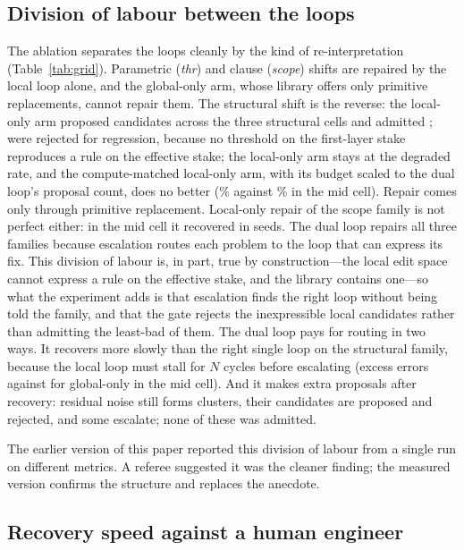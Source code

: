 \documentclass[11pt]{article}
\begin{document}
\subsection{Division of labour between the loops}

The ablation separates the loops cleanly by the kind of re-interpretation (Table~\ref{tab:grid}). Parametric (\emph{thr}) and clause (\emph{scope}) shifts are repaired by the local loop alone, and the global-only arm, whose library offers only primitive replacements, cannot repair them. The structural shift is the reverse: the local-only arm proposed \famstructlocalonlyprop{} candidates across the three structural cells and admitted \famstructlocalonlyadm{}; \famstructlocalonlyreg{} were rejected for regression, because no threshold on the first-layer stake reproduces a rule on the effective stake; the local-only arm stays at the degraded rate, and the compute-matched local-only arm, with its budget scaled to the dual loop's proposal count, does no better (\fpstructlocalonlycm\% against \fpstructdegraded\% in the mid cell). Repair comes only through primitive replacement. Local-only repair of the scope family is not perfect either: in the mid cell it recovered in \loScopeMidRecovered{} seeds. The dual loop repairs all three families because escalation routes each problem to the loop that can express its fix. This division of labour is, in part, true by construction---the local edit space cannot express a rule on the effective stake, and the library contains one---so what the experiment adds is that escalation finds the right loop without being told the family, and that the gate rejects the inexpressible local candidates rather than admitting the least-bad of them. The dual loop pays for routing in two ways. It recovers more slowly than the right single loop on the structural family, because the local loop must stall for $N$ cycles before escalating (excess errors \excstructmiddual{} against \excstructmidglobalonly{} for global-only in the mid cell). And it makes extra proposals after recovery: residual noise still forms clusters, their candidates are proposed and rejected, and some escalate; none of these was admitted.

The earlier version of this paper reported this division of labour from a single run on different metrics. A referee suggested it was the cleaner finding; the measured version confirms the structure and replaces the anecdote.

\subsection{Recovery speed against a human engineer}
\end{document}
